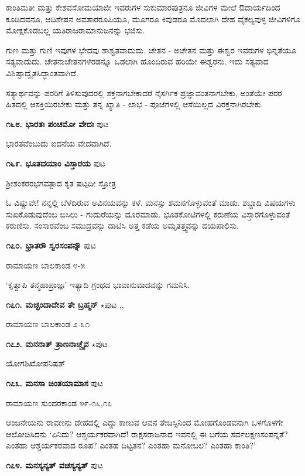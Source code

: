 ಕಾಂತಿಮತೀ ಮತ್ತು ಕೇಶವಸೋಮಯಾಜೀ ಇವರುಗಳ ಸುಕುಮಾರಪುತ್ರನೂ ಜೀವಿಗಳ ಮೇಲೆ ಔದಾರ್ಯದಿಂದ ಕೂಡಿದವನೂ, ಆದಿಶೇಷನ ಅವತಾರರೂಪಿಯೂ, ಮೂಗರೂ ಕಿವುಡರೂ ಮೊದಲಾಗಿ ದೇಹ ವೈಕಲ್ಯವುಳ್ಳ ಜೀವಿಗಳಿಗೂ ಮೋಕ್ಷಕೊಡಬಲ್ಲ ಯತಿರಾಜರಾಮಾನುಜನನ್ನು ಭಜಿಸು.

ಗುಣ ಮತ್ತು ಗುಣಿ ಇವುಗಳ ಭೇದವು ಶಾಶ್ವತವಾದುದು. ಚೇತನ - ಅಚೇತನ ಮತ್ತು ಈಶ್ವರ ಇವರುಗಳ ಭಿನ್ನತೆಯೂ ಸತ್ಯವಾದುದು. ಚೇತನಾಚೇತನಗಳೆರಡನ್ನೂ ಒಡಲಾಗಿ ಹೊಂದಿರುವ ಹರಿಯೇ ಈಶ್ವರನು. ಇದು ಸತ್ಯವಾದ ವಿಶಿಷ್ಟಾದ್ವೈತಸಿದ್ಧಾಂತವಾಗಿದೆ.

ಸತ್ಯಾರ್ಥವನ್ನು ಪರರಿಗೆ ತಿಳಿಸುವುದರಲ್ಲಿ ಶಕ್ತನಾಗಬೇಕಾದರೆ ನೈಸರ್ಗಿಕ ಪ್ರಜ್ಞಾವಂತನಾಗಬೇಕು, ಅಂತೆಯೇ ಪರರ ಹಿತದಲ್ಲಿ ಆಸಕ್ತಿಯಿರಬೇಕು ಮತ್ತು ತನ್ನ ಖ್ಯಾತಿ - ಲಾಭ - ಪೂಜೆಗಳಲ್ಲಿ ಆಸೆಯಿಲ್ಲದ ವಿರಕ್ತನಾಗಿರಬೇಕು.

\medskip
\noindent\textbf{೧೬೮. ಭಾರತಃ ಪಂಚಮೋ ವೇದಃ} \hfill ಪುಟ \pageref{122}

ಭಾರತವೆಂಬುದು ಐದನೆಯ ವೇದವಾಗಿದೆ.

\medskip
\noindent\textbf{೧೬೯. ಭೂತದಯಾಂ ವಿಸ್ತಾರಯ} \hfill ಪುಟ \pageref{115}

\hfill ಶ್ರೀಶಂಕರರಭಗವತ್ಪಾದ ಕೃತ ಷಟ್ಪದೀ ಸ್ತೋತ್ರ

ಓ ವಿಷ್ಣುವೇ! ನನ್ನಲ್ಲಿ ಬೆಳೆದಿರುವ ಅವಿನಯವನ್ನು ಕಳೆ. ಮನಸ್ಸು ಶಮನಗೊಳ್ಳುವಂತೆ ಮಾಡು. ಶಬ್ದಾದಿ ವಿಷಯಗಳು ಸುಖಕೊಡುವುದೆಂಬ ಬಿಸಿಲು - ಗುದುರೆಯನ್ನು ದೂರಮಾಡು. ಭೂತಕೋಟಿಗಳಲ್ಲಿ ಕರುಣೆಯ ವಿಸ್ತಾರಗೊಳ್ಳುವಂತೆ ಕರುಣಿಸು. ಸಂಸಾರವೆಂಬ ಸಮುದ್ರವನ್ನು ದಾಟಿಸಿ ಅತ್ತ ಕಡೆಯ ಅಮೃತತ್ತ್ವವನ್ನು ದಯಪಾಲಿಸು.

\medskip
\noindent\textbf{೧೭೦. ಭ್ರಾತರೌ ಸ್ವರಸಂಪನ್ನೌ} \hfill ಪುಟ \pageref{250}

\hfill ರಾಮಾಯಣ ಬಾಲಕಾಂಡ ೪-೫

`ಕೃತ್ವಾಪಿ ತನ್ಮಹಾಪ್ರಾಜ್ಞಃ' ಇತ್ಯಾದಿ ಗ್ರಂಥದ ಭಾವಾನುವಾದವನ್ನು ಗಮನಿಸಿ.

\medskip
\noindent\textbf{೧೭೧. ಮಚ್ಛಂದಾದೇವ ತೇ ಬ್ರಹ್ಮನ್} $\star$\hfill ಪುಟ \pageref{21},\pageref{203},\pageref{250}

\hfill ರಾಮಾಯಣ ಬಾಲಕಾಂಡ ೨-೩೧


\medskip
\noindent\textbf{೧೭೨. ಮನನಾತ್ ತ್ರಾಣನಾಚ್ಚೈವ} $\star$\hfill ಪುಟ \pageref{10}

\hfill ಯೋಗಶಿಖೋಪನಿಷತ್

\medskip
\noindent\textbf{೧೭೩. ಮನಸಾ ಚಿಂತಯಾಮಾಸ} \hfill ಪುಟ \pageref{192}

\hfill ರಾಮಾಯಣ ಸುಂದರಕಾಂಡ ೪೯-೧೬,೧೭

ಆಂಜನೇಯನು ರಾವಣನು ದೇಹದಲ್ಲಿ ಎದ್ದು ಕಾಣುವ ಆವನ ತೇಜಸ್ಸಿನಿಂದ ಮೋಹಗೊಂಡವನಾಗಿ ಒಳಗೊಳಗೇ ಆಲೋಚಿಸಿದನು `ಏನಿದು? ಆಶ್ಚರ್ಯಕರವಾಗಿದೆ! ರಾಕ್ಷಸರಾಜನಾದ ಇವನಲ್ಲಿ ಈ ಬಗೆಯ ಸರ್ವಲಕ್ಷಣಸಂಪನ್ನತೆ? ಎಂತಹಾ ಆಶ್ಚರ್ಯಕರವಾದ ರೂಪ? ಎಂತಹ ದಿಟ್ಟತನ? ಎಂತಹಾ ಮನೋಬಲ? ಎಂತಹಾ ಕಾಂತಿ?'

\medskip
\noindent\textbf{೧೭೪. ಮನಸ್ಯನ್ಯತ್ ವಚಸ್ಯನ್ಯತ್} \hfill ಪುಟ \pageref{102}


